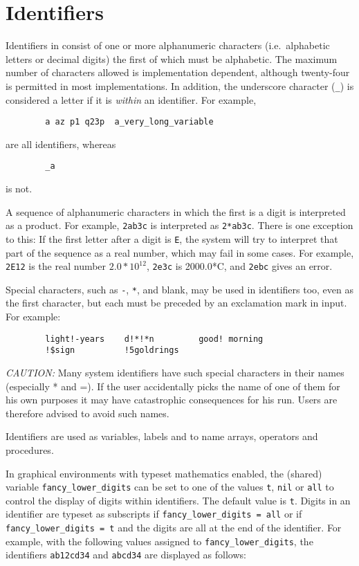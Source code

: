 \section{Identifiers}

Identifiers in {\REDUCE} consist of one or more
alphanumeric characters (i.e.\ alphabetic letters or decimal
digits) the first of which must be alphabetic.  The maximum number of
characters allowed is implementation dependent, although twenty-four is
permitted in most implementations.  In addition, the underscore character
(\texttt{\_}) is considered a letter if it is \emph{within} an identifier.
For example,
\begin{verbatim}
        a az p1 q23p  a_very_long_variable
\end{verbatim}
are all identifiers, whereas
\begin{verbatim}
        _a
\end{verbatim}
is not.

A sequence of alphanumeric characters in which the first is a digit is
interpreted as a product.  For example, \texttt{2ab3c} is interpreted as
\texttt{2*ab3c}.  There is one exception to this:  If the first letter after a
digit is \texttt{E}, the system will try to interpret that part of the
sequence as a real number, which may fail in some cases.  For
example, \texttt{2E12} is the real number $2.0*10^{12}$, \texttt{2e3c} is
2000.0*C, and \texttt{2ebc} gives an error.

Special characters, such as \texttt{-}, \texttt{*}, and blank, may be
used in identifiers
too, even as the first character, but each must be preceded by an
exclamation mark in input.  For example:
\begin{verbatim}
        light!-years    d!*!*n         good! morning
        !$sign          !5goldrings
\end{verbatim}
\textit{CAUTION:} Many system identifiers have such special characters in their
names (especially * and =). If the user accidentally picks the name of one
of them for his own purposes it may have catastrophic consequences for his
{\REDUCE} run.  Users are therefore advised to avoid such names.

Identifiers are used as variables, labels and to name arrays, operators
and procedures.

In graphical environments with typeset mathematics enabled, the
(shared) variable
\texttt{fancy\_lower\_digits} can be set
to one of the values \texttt{t}, \texttt{nil} or \texttt{all} to
control the display of digits within identifiers.  The default value
is \texttt{t}.  Digits in an identifier are typeset as subscripts if
\texttt{fancy\_lower\_digits~=~all} or if
\texttt{fancy\_lower\_digits~=~t} and the digits are all at the end of
the identifier.  For example, with the following values assigned to
\texttt{fancy\_lower\_digits}, the identifiers \texttt{ab12cd34} and
\texttt{abcd34} are displayed as follows:


